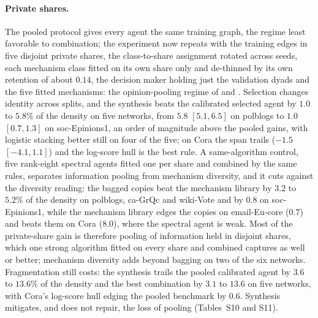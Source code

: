 \documentclass[12pt]{article}
\begin{document}
\paragraph{Private shares.}
The pooled protocol gives every agent the same training graph, the regime least favorable to combination; the experiment now repeats with the training edges in five disjoint private shares, the class-to-share assignment rotated across seeds, each mechanism class fitted on its own share only and de-thinned by its own retention of about $0.14$, the decision maker holding just the validation dyads and the five fitted mechanisms: the opinion-pooling regime of \citet{West1992} and \citet{McAlinnWest2019}. Selection changes identity across splits, and the synthesis beats the calibrated selected agent by $1.0$ to $5.8\%$ of the density on five networks, from $5.8$ $[5.1,6.5]$ on polblogs to $1.0$ $[0.7,1.3]$ on soc-Epinions1, an order of magnitude above the pooled gains, with logistic stacking better still on four of the five; on Cora the span trails ($-1.5$ $[-4.1,1.1]$) and the log-score hull is the best rule. A same-algorithm control, five rank-eight spectral agents fitted one per share and combined by the same rules, separates information pooling from mechanism diversity, and it cuts against the diversity reading: the bagged copies beat the mechanism library by $3.2$ to $5.2\%$ of the density on polblogs, ca-GrQc and wiki-Vote and by $0.8$ on soc-Epinions1, while the mechanism library edges the copies on email-Eu-core ($0.7$) and beats them on Cora ($8.0$), where the spectral agent is weak. Most of the private-share gain is therefore pooling of information held in disjoint shares, which one strong algorithm fitted on every share and combined captures as well or better; mechanism diversity adds beyond bagging on two of the six networks. Fragmentation still costs: the synthesis trails the pooled calibrated agent by $3.6$ to $13.6\%$ of the density and the best combination by $3.1$ to $13.6$ on five networks, with Cora's log-score hull edging the pooled benchmark by $0.6$. Synthesis mitigates, and does not repair, the loss of pooling (Tables~S10 and S11).
\end{document}
